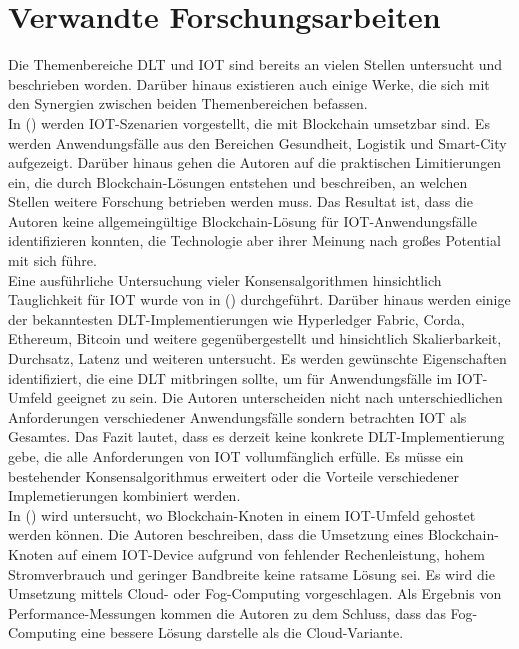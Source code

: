 \chapter{Verwandte Forschungsarbeiten}
\label{ch:relatedwork}
Die Themenbereiche \ac{DLT} und \ac{IOT} sind bereits an vielen Stellen untersucht und beschrieben worden. Darüber hinaus existieren auch einige Werke, die sich mit den Synergien zwischen beiden Themenbereichen befassen.\\
In  (\cite{Review2018}) werden \ac{IOT}-Szenarien vorgestellt, die mit Blockchain umsetzbar sind. Es werden Anwendungsfälle aus den Bereichen Gesundheit, Logistik und Smart-City aufgezeigt. Darüber hinaus gehen die Autoren \citeauthor{Review2018} auf die praktischen Limitierungen ein, die durch Blockchain-Lösungen entstehen und beschreiben, an welchen Stellen weitere Forschung betrieben werden muss. Das Resultat ist, dass die Autoren keine allgemeingültige Blockchain-Lösung für \ac{IOT}-Anwendungsfälle identifizieren konnten, die Technologie aber ihrer Meinung nach großes Potential mit sich führe.\\
Eine ausführliche Untersuchung vieler Konsensalgorithmen hinsichtlich Tauglichkeit für \ac{IOT} wurde von \citeauthor{Salimitari2018ASO} in  (\cite{Salimitari2018ASO}) durchgeführt. Darüber hinaus werden einige der bekanntesten DLT-Implementierungen wie Hyperledger Fabric, Corda, Ethereum, Bitcoin und weitere gegenübergestellt und hinsichtlich Skalierbarkeit, Durchsatz, Latenz und weiteren untersucht. Es werden gewünschte Eigenschaften identifiziert, die eine \ac{DLT} mitbringen sollte, um für Anwendungsfälle im \ac{IOT}-Umfeld geeignet zu sein. Die Autoren \citeauthor{Salimitari2018ASO} unterscheiden nicht nach unterschiedlichen Anforderungen verschiedener Anwendungsfälle sondern betrachten \ac{IOT} als Gesamtes. Das Fazit lautet, dass es derzeit keine konkrete \ac{DLT}-Implementierung gebe, die alle Anforderungen von \ac{IOT} vollumfänglich erfülle. Es müsse ein bestehender Konsensalgorithmus erweitert oder die Vorteile verschiedener Implemetierungen kombiniert werden.\\
In  (\cite{BaaS2016}) wird untersucht, wo Blockchain-Knoten in einem \ac{IOT}-Umfeld gehostet werden können. Die Autoren \citeauthor{BaaS2016} beschreiben, dass die Umsetzung eines Blockchain-Knoten auf einem \ac{IOT}-Device aufgrund von fehlender Rechenleistung, hohem Stromverbrauch und geringer Bandbreite keine ratsame Lösung sei. Es wird die Umsetzung mittels Cloud- oder Fog-Computing vorgeschlagen. Als Ergebnis von Performance-Messungen kommen die Autoren zu dem Schluss, dass das Fog-Computing eine bessere Lösung darstelle als die Cloud-Variante.\\

